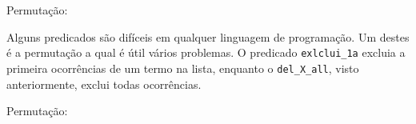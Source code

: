 \documentclass[sans]{beamer}
\begin{document}

\begin{frame}
\begin{block}{Permutação:}


Alguns predicados são difíceis em qualquer
linguagem de programa\c{c}ão. Um destes é a permutação
a qual é útil vários problemas. O predicado {\tt exlclui\_1a} excluia
a primeira ocorrências de um termo na lista, enquanto o  {\tt del\_X\_all}, visto anteriormente, exclui todas ocorrências.



\end{block}
\end{frame}


\begin{frame}
\begin{block}{Permutação:}



\end{block}
\end{frame}

\end{document}
